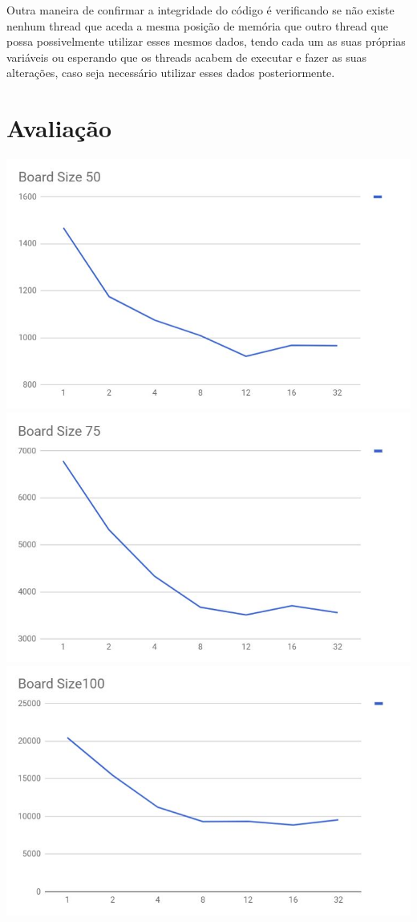 \documentclass[a4paper]{article}
\begin{document}
    Outra maneira de confirmar a integridade do código é verificando se não existe nenhum thread que aceda a mesma posição de memória que outro thread que possa possivelmente utilizar esses mesmos dados, tendo cada um as suas próprias variáveis ou esperando que os threads acabem de executar e fazer as suas alterações, caso seja necessário utilizar esses dados posteriormente.
    
    \section{Avaliação}
    \includegraphics{bs50.JPG}
    \includegraphics{bs75.JPG}
    \includegraphics{bs100.JPG}
    
\end{document}
